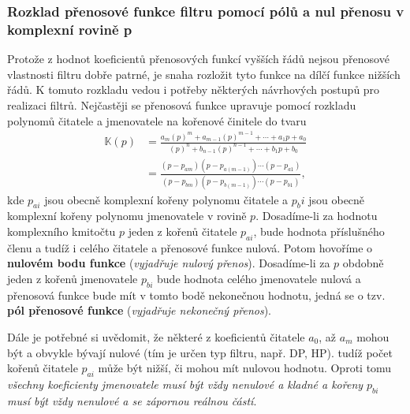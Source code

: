       \subsubsection{Rozklad přenosové funkce filtru pomocí pólů a nul přenosu v komplexní rovině p}
        Protože z hodnot koeficientů přenosových funkcí vyšších řádů nejsou přenosové vlastnosti
        filtru dobře patrné, je snaha rozložit tyto funkce na dílčí funkce nižších řádů. K tomuto
        rozkladu vedou i potřeby některých návrhových postupů pro realizaci filtrů. Nejčastěji se
        přenosová funkce upravuje pomocí rozkladu polynomů čitatele a jmenovatele na kořenové
        činitele do tvaru
        \begin{align}\label{aes:eq032}
          \mathbb{K}(p) 
            &= \frac{a_{m}(p)^m + a_{m-1}(p)^{m-1} + \cdots + a_{1}p +a_{0}}
                    {(p)^n + b_{n-1}(p)^{n-1} + \cdots + b_{1}p +b_{0}}          \nonumber\\
            &= \frac{(p-p_{am})(p-p_{a(m-1)})\cdots(p-p_{a1})}
                    {(p-p_{bm})(p-p_{b(m-1)})\cdots(p-p_{b1})},                  
        \end{align}
        kde \(p_{ai}\) jsou obecně komplexní kořeny polynomu čitatele a \(p_bi\) jsou obecně
        komplexní kořeny polynomu jmenovatele v rovině \(p\). Dosadíme-li za hodnotu komplexního
        kmitočtu \(p\) jeden z kořenů čitatele \(p_{ai}\), bude hodnota příslušného členu a tudíž i
        celého čitatele a přenosové funkce nulová. Potom hovoříme o \textbf{nulovém bodu funkce}
        (\emph{vyjadřuje nulový přenos}). Dosadíme-li za \(p\) obdobně jeden z kořenů jmenovatele
        \(p_{bi}\) bude hodnota celého jmenovatele nulová a přenosová funkce bude mít v tomto bodě
        nekonečnou hodnotu, jedná se o tzv. \textbf{pól přenosové funkce} (\emph{vyjadřuje nekonečný
        přenos}). 
        
        Dále je potřebné si uvědomit, že některé z koeficientů čitatele \(a_0\), až \(a_m\) mohou
        být a obvykle bývají nulové (tím je určen typ filtru, např. DP, HP). tudíž počet kořenů
        čitatele \(p_{ai}\) může být nižší, či mohou mít nulovou hodnotu. Oproti tomu \emph{všechny
        koeficienty jmenovatele musí být vždy nenulové a kladné a kořeny \(p_{bi}\) musí být vždy
        nenulové a se zápornou reálnou částí}. 
        
